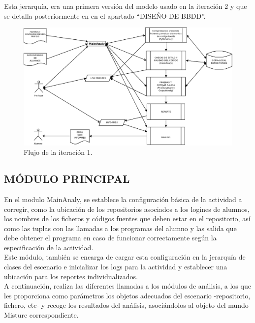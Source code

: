 Esta jerarquía, era una primera versión del modelo usado en la iteración 2 y que se detalla posteriormente en en el apartado ``DISEÑO DE BBDD''.\\

\begin{figure}[H]
   \centering
   \includegraphics[width=16cm]{img/Diagram2_iteracion1}
   \caption{Flujo de la iteración 1.}
   \label{figura:ite1}
\end{figure}


\subsection{MÓDULO PRINCIPAL}

En el modulo MainAnaly, se establece la configuración básica de la actividad a corregir, como la ubicación de los repositorios asociados a los logines de alumnos, los nombres de los ficheros y códigos fuentes que deben estar en el repositorio, así como las tuplas con las llamadas a los programas del alumno y las salida que debe obtener el programa en caso de funcionar correctamente según la especificación de la actividad.\\


Este módulo, también se encarga de cargar esta configuración en la jerarquía de clases del escenario e inicializar los logs para la actividad y establecer una ubicación para los reportes individualizados.\\


A continuación, realiza las diferentes llamadas a los módulos de análisis, a los que les proporciona como parámetros los objetos adecuados del escenario -repositorio, fichero, etc- y recoge los resultados del análisis, asociándolos al objeto del mundo Misture correspondiente.\\

